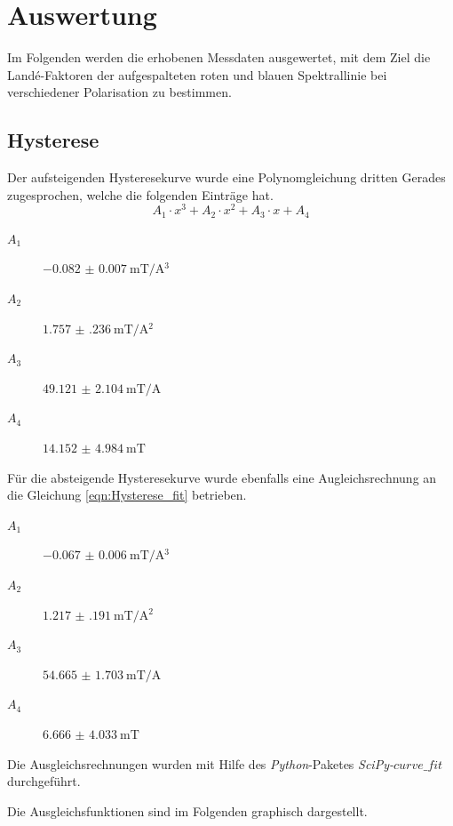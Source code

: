\section{Auswertung}

Im Folgenden werden die erhobenen Messdaten ausgewertet, mit dem Ziel
die Landé-Faktoren der aufgespalteten roten und blauen Spektrallinie bei verschiedener
Polarisation zu bestimmen.

\subsection{Hysterese}

Der aufsteigenden Hysteresekurve wurde eine Polynomgleichung dritten Gerades zugesprochen,
welche die folgenden Einträge hat.
\begin{equation}
  \label{eqn:Hysterese_fit}
  A_1 \cdot x^3 + A_2 \cdot x^2 + A_3 \cdot x + A_4
\end{equation}
\begin{description}
  \item[$A_1$] $\SI{-0.082(7)}{\milli\tesla\per\ampere^3}$
  \item[$A_2$] $\SI{1.757(236)}{\milli\tesla\per\ampere^2}$
  \item[$A_3$] $\SI{49.121(2104)}{\milli\tesla\per\ampere}$
  \item[$A_4$] $\SI{14.152(4984)}{\milli\tesla}$
\end{description}

Für die absteigende Hysteresekurve wurde ebenfalls eine Augleichsrechnung an die
Gleichung \eqref{eqn:Hysterese_fit} betrieben.
\begin{description}
  \item[$A_1$] $\SI{-0.067(6)}{\milli\tesla\per\ampere^3}$
  \item[$A_2$] $\SI{1.217(191)}{\milli\tesla\per\ampere^2}$
  \item[$A_3$] $\SI{54.665(1703)}{\milli\tesla\per\ampere}$
  \item[$A_4$] $\SI{6.666(4033)}{\milli\tesla}$
\end{description}

Die Ausgleichsrechnungen wurden mit Hilfe des \emph{Python}-Paketes
\emph{SciPy-$curve\_fit$} durchgeführt.

Die Ausgleichsfunktionen sind im Folgenden graphisch dargestellt.

